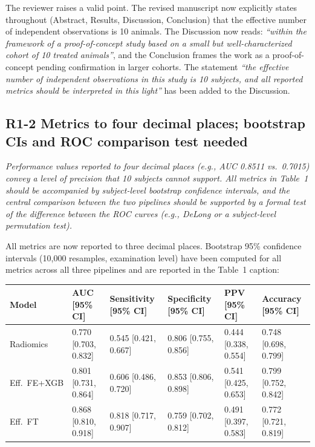 \documentclass[12pt]{article}
\newcommand{\rc}[1]{\begin{reviewerbox}\itshape #1\end{reviewerbox}}
\begin{document}
The reviewer raises a valid point. The revised manuscript now explicitly states throughout (Abstract, Results, Discussion, Conclusion) that the effective number of independent observations is 10 animals. The Discussion now reads: \textit{``within the framework of a proof-of-concept study based on a small but well-characterized cohort of 10 treated animals''}, and the Conclusion frames the work as a proof-of-concept pending confirmation in larger cohorts. The statement \textit{``the effective number of independent observations in this study is 10 subjects, and all reported metrics should be interpreted in this light''} has been added to the Discussion.

\bigskip

\vspace{6pt}%
\subsection*{R1-2 \quad Metrics to four decimal places; bootstrap CIs and ROC comparison test needed}

\rc{Performance values reported to four decimal places (e.g., AUC 0.8511 vs.\ 0.7015) convey a level of precision that 10 subjects cannot support. All metrics in Table~1 should be accompanied by subject-level bootstrap confidence intervals, and the central comparison between the two pipelines should be supported by a formal test of the difference between the ROC curves (e.g., DeLong or a subject-level permutation test).}

All metrics are now reported to three decimal places. Bootstrap 95\% confidence intervals (10,000 resamples, examination level) have been computed for all metrics across all three pipelines and are reported in the Table~1 caption:

\begin{table}[h]
\centering\small
\begin{tabular}{llllll}
\toprule
Model & AUC {[}95\% CI{]} & Sensitivity {[}95\% CI{]} & Specificity {[}95\% CI{]} & PPV {[}95\% CI{]} & Accuracy {[}95\% CI{]} \\
\midrule
Radiomics   & 0.770 {[}0.703, 0.832{]} & 0.545 {[}0.421, 0.667{]} & 0.806 {[}0.755, 0.856{]} & 0.444 {[}0.338, 0.554{]} & 0.748 {[}0.698, 0.799{]} \\
Eff.\ FE+XGB & 0.801 {[}0.731, 0.864{]} & 0.606 {[}0.486, 0.720{]} & 0.853 {[}0.806, 0.898{]} & 0.541 {[}0.425, 0.653{]} & 0.799 {[}0.752, 0.842{]} \\
Eff.\ FT    & 0.868 {[}0.810, 0.918{]} & 0.818 {[}0.717, 0.907{]} & 0.759 {[}0.702, 0.812{]} & 0.491 {[}0.397, 0.583{]} & 0.772 {[}0.721, 0.819{]} \\
\bottomrule
\end{tabular}
\end{table}
\end{document}

